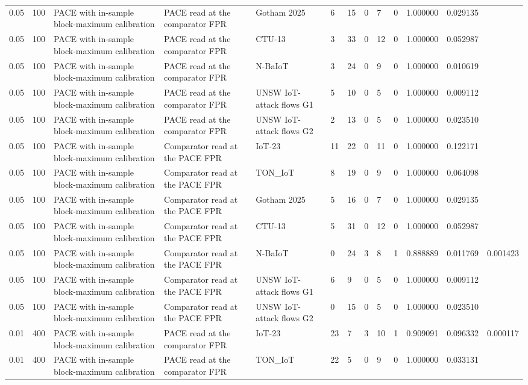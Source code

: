 \begin{tabular}{lllllllllllll}
0.05 & 100 & PACE with in-sample block-maximum calibration & PACE read at the comparator FPR & Gotham 2025 & 6 & 15 & 0 & 7 & 0 & 1.000000 & 0.029135 &  \\
0.05 & 100 & PACE with in-sample block-maximum calibration & PACE read at the comparator FPR & CTU-13 & 3 & 33 & 0 & 12 & 0 & 1.000000 & 0.052987 &  \\
0.05 & 100 & PACE with in-sample block-maximum calibration & PACE read at the comparator FPR & N-BaIoT & 3 & 24 & 0 & 9 & 0 & 1.000000 & 0.010619 &  \\
0.05 & 100 & PACE with in-sample block-maximum calibration & PACE read at the comparator FPR & UNSW IoT-attack flows G1 & 5 & 10 & 0 & 5 & 0 & 1.000000 & 0.009112 &  \\
0.05 & 100 & PACE with in-sample block-maximum calibration & PACE read at the comparator FPR & UNSW IoT-attack flows G2 & 2 & 13 & 0 & 5 & 0 & 1.000000 & 0.023510 &  \\
0.05 & 100 & PACE with in-sample block-maximum calibration & Comparator read at the PACE FPR & IoT-23 & 11 & 22 & 0 & 11 & 0 & 1.000000 & 0.122171 &  \\
0.05 & 100 & PACE with in-sample block-maximum calibration & Comparator read at the PACE FPR & TON\_IoT & 8 & 19 & 0 & 9 & 0 & 1.000000 & 0.064098 &  \\
0.05 & 100 & PACE with in-sample block-maximum calibration & Comparator read at the PACE FPR & Gotham 2025 & 5 & 16 & 0 & 7 & 0 & 1.000000 & 0.029135 &  \\
0.05 & 100 & PACE with in-sample block-maximum calibration & Comparator read at the PACE FPR & CTU-13 & 5 & 31 & 0 & 12 & 0 & 1.000000 & 0.052987 &  \\
0.05 & 100 & PACE with in-sample block-maximum calibration & Comparator read at the PACE FPR & N-BaIoT & 0 & 24 & 3 & 8 & 1 & 0.888889 & 0.011769 & 0.001423 \\
0.05 & 100 & PACE with in-sample block-maximum calibration & Comparator read at the PACE FPR & UNSW IoT-attack flows G1 & 6 & 9 & 0 & 5 & 0 & 1.000000 & 0.009112 &  \\
0.05 & 100 & PACE with in-sample block-maximum calibration & Comparator read at the PACE FPR & UNSW IoT-attack flows G2 & 0 & 15 & 0 & 5 & 0 & 1.000000 & 0.023510 &  \\
0.01 & 400 & PACE with in-sample block-maximum calibration & PACE read at the comparator FPR & IoT-23 & 23 & 7 & 3 & 10 & 1 & 0.909091 & 0.096332 & 0.000117 \\
0.01 & 400 & PACE with in-sample block-maximum calibration & PACE read at the comparator FPR & TON\_IoT & 22 & 5 & 0 & 9 & 0 & 1.000000 & 0.033131 &  \\

\end{tabular}
